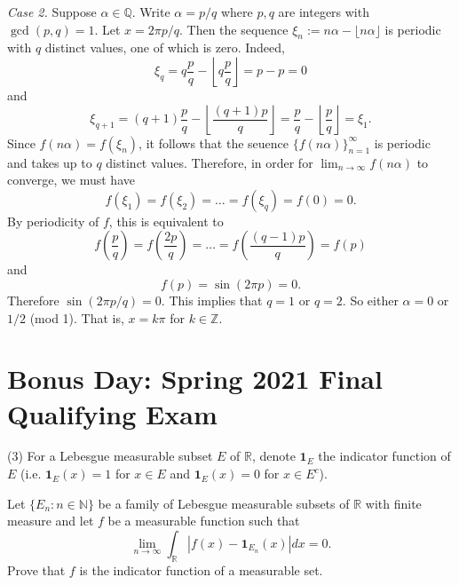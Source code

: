 \documentclass[answers]{exam}
\theoremstyle{problemstyle}
\newcommand{\1}[1]{\textbf{1}_{\left[#1\right]}} %
\def\limn{\lim_{n\to\infty}} %
\def\R{\mathbb{R}} %
\def\Z{\mathbb{Z}} %
\def\Q{\mathbb{Q}} %
\def\({\left (}
\def\){\right )}
\begin{document}
\begin{questions}
\begin{solution}
  \textit{Case 2.} Suppose $\alpha\in\Q$. Write $\alpha = p/q$ where $p,q$ are integers with $\gcd(p,q)=1$. Let $x = 2\pi p/q$. Then the sequence $\xi_{n}:= n\alpha-\lfloor n \alpha \rfloor$ is periodic with $q$ distinct values, one of which is zero. Indeed,
  \begin{equation*}
    \xi_{q}=q \frac{p}{q} - \left\lfloor q \frac{p}{q} \right\rfloor = p-p = 0
  \end{equation*}
  and
  \begin{equation*}
    \xi_{q+1}= (q+1)\frac{p}{q} - \left\lfloor \frac{(q+1)p}{q} \right\rfloor = \frac{p}{q} - \left\lfloor \frac{p}{q}\right\rfloor = \xi_{1}.
  \end{equation*}
  Since $f(n\alpha) = f(\xi_{n})$, it follows that the seuence $\{f(n\alpha)\}_{n=1}^{\infty}$ is periodic and takes up to $q$ distinct values. Therefore, in order for $\limn f(n\alpha)$ to converge, we must have
  \[ f(\xi_{1})=f(\xi_{2})=\ldots=f(\xi_{q})=f(0)=0. \]
  By periodicity of $f$, this is equivalent to
	\begin{equation*}
    f\(\frac{p}{q}\)= f\(\frac{2p}{q}\)=\ldots=f\left(\frac{(q-1)p}{q}\right)=f(p)
  \end{equation*}
  and
  \begin{equation*}
    f(p) = \sin(2\pi p)=0.
  \end{equation*}
  Therefore $\sin(2\pi p/q)=0$. This implies that $q=1$ or $q=2$. So either $\alpha =0$ or $1/2$ (mod 1). That is, $x=k\pi$ for $k\in \Z$.
\end{solution}


\newpage
\section{Bonus Day: Spring 2021 Final Qualifying Exam}

\question (3) For a Lebesgue measurable subset $E$ of $\R$, denote $\textbf{1}_E$ the indicator function of $E$ (i.e. $\textbf{1}_E(x)=1$ for $x\in E$ and $\textbf{1}_E(x) = 0$ for $x\in E^c$).

Let $\{E_n: n\in \mathbb{N}\}$ be a family of Lebesgue measurable subsets of $\R$ with finite measure and let $f$ be a measurable function such that \begin{equation*}
\limn \int_{\R} | f(x)-\textbf{1}_{E_n}(x)| dx = 0.
\end{equation*}
Prove that $f$ is the indicator function of a measurable set.


\end{questions}
\end{document}
